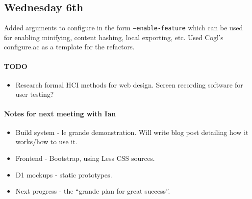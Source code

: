 \subsection{Wednesday 6th}
Added arguments to configure in the form \texttt{--enable-feature} which can be
used for enabling minifying, content hashing, local exporting, etc. Used Cogl's
configure.ac as a template for the refactors.

\paragraph{TODO}
\begin{itemize}
\item Research formal HCI methods for web design. Screen recording software for
  user testing?
\end{itemize}

\paragraph{Notes for next meeting with Ian}
\begin{itemize}
\item Build system - le grande demonstration. Will write blog post detailing how
  it works/how to use it.
\item Frontend - Bootstrap, using Less CSS sources.
\item D1 mockups - static prototypes.
\item Next progress - the ``grande plan for great success''.
\end{itemize}

